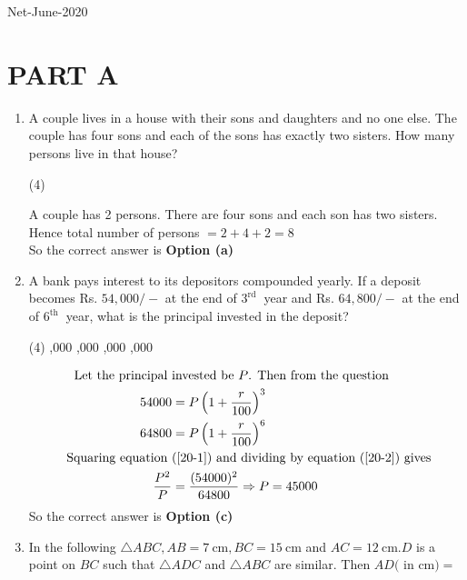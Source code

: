 \begin{abox}
	Net-June-2020
	\end{abox}
\section{PART A}
\begin{enumerate}
	\item A couple lives in a house with their sons and daughters and no one else. The couple has four sons and each of the sons has exactly two sisters. How many persons live in that house?
	 \begin{tasks}(4)
	\end{tasks}
\begin{answer}
 A couple has 2 persons. There are four sons and each son has two sisters. Hence total number of persons $=2+4+2=8$\\
So the correct answer is \textbf{Option (a)}
\end{answer}
\item A bank pays interest to its depositors compounded yearly. If a deposit becomes Rs. $54,000 /-$ at the end of $3^{\text {rd }}$ year and Rs. $64,800 /-$ at the end of $6^{\text {th }}$ year, what is the principal invested in the deposit?
 \begin{tasks}(4)
	,000
	,000
	,000
	,000
\end{tasks}
\begin{answer}
	\begin{align}
\text{	Let the principal }&\text{invested be $P$. Then from the question}\notag\\
	54000&=P\left(1+\frac{r}{100}\right)^{3} \label{20-1}\\
	64800&=P\left(1+\frac{r}{100}\right)^{6}\label{20-2}\\
\text{	Squaring equation }&\text{(\ref{20-1}) and dividing by equation (\ref{20-2}) gives}\notag\\
	\frac{P^{2}}{P}&=\frac{(54000)^{2}}{64800} \Rightarrow P=45000 \notag
	\end{align}
	So the correct answer is \textbf{Option (c)}
\end{answer}
\item In the following $\triangle A B C, A B=7 \mathrm{~cm}, B C=15 \mathrm{~cm}$ and $A C=12 \mathrm{~cm} . D$ is a point on $B C$ such that $\triangle A D C$ and $\triangle A B C$ are similar. Then $A D($ in $\mathrm{cm})=$	

\end{enumerate}
